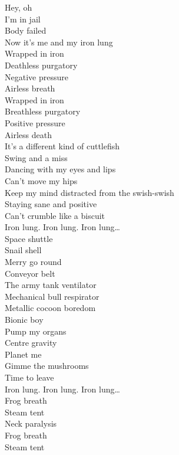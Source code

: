 

Hey, oh \\
I'm in jail \\
Body failed \\
Now it's me and my iron lung \\
Wrapped in iron \\
Deathless purgatory \\
Negative pressure \\
Airless breath \\
Wrapped in iron \\
Breathless purgatory \\
Positive pressure \\
Airless death \\

It's a different kind of cuttlefish \\
Swing and a miss \\
Dancing with my eyes and lips \\
Can't move my hips \\
Keep my mind distracted from the swish-swish \\
Staying sane and positive \\
Can't crumble like a biscuit \\

Iron lung. Iron lung. Iron lung… \\

Space shuttle \\
Snail shell \\
Merry go round \\
Conveyor belt \\
The army tank ventilator \\
Mechanical bull respirator \\
Metallic cocoon boredom \\
Bionic boy \\
Pump my organs \\
Centre gravity \\
Planet me \\
Gimme the mushrooms \\
Time to leave \\

Iron lung. Iron lung. Iron lung… \\

Frog breath \\
Steam tent \\
Neck paralysis \\
Frog breath \\
Steam tent \\

